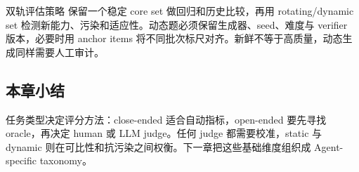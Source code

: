 
\begin{importantbox}{双轨评估策略}
保留一个稳定 core set 做回归和历史比较，再用 rotating/dynamic set 检测新能力、污染和适应性。动态题必须保留生成器、seed、难度与 verifier 版本，必要时用 anchor items 将不同批次标尺对齐。新鲜不等于高质量，动态生成同样需要人工审计。
\end{importantbox}

\subsection{本章小结}

任务类型决定评分方法：close-ended 适合自动指标，open-ended 要先寻找 oracle，再决定 human 或 LLM judge。任何 judge 都需要校准，static 与 dynamic 则在可比性和抗污染之间权衡。下一章把这些基础维度组织成 Agent-specific taxonomy。

